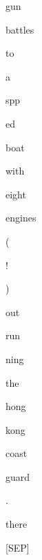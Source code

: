 \documentclass[varwidth=150mm]{standalone}
\begin{document}
\begin{CJK*}{UTF8}{gbsn}
{{{\colorbox{red!5.785243034362793}{\strut gun} \colorbox{red!3.0606062412261963}{\strut battles} \colorbox{red!3.203688383102417}{\strut to} \colorbox{red!4.213789939880371}{\strut a} \colorbox{red!6.602896690368652}{\strut spp}\colorbox{red!4.277715682983398}{\strut ed}\colorbox{red!17.725831985473633}{\strut boat} \colorbox{red!2.408601760864258}{\strut with} \colorbox{red!1.4817951917648315}{\strut eight} \colorbox{red!15.723183631896973}{\strut engines} \colorbox{red!6.670661449432373}{\strut (} \colorbox{red!6.659420967102051}{\strut !} \colorbox{red!1.9786384105682373}{\strut )} \colorbox{red!1.1148802042007446}{\strut out}\colorbox{red!2.905301809310913}{\strut run}\colorbox{red!1.390824794769287}{\strut ning} \colorbox{red!8.566407203674316}{\strut the} \colorbox{red!0.0}{\strut hong} \colorbox{red!3.5530812740325928}{\strut kong} \colorbox{red!18.30976104736328}{\strut coast} \colorbox{red!9.414864540100098}{\strut guard} \colorbox{red!0.0}{\strut .} \colorbox{red!31.8472843170166}{\strut there} \colorbox{red!2.3319778442382812}{\strut [SEP]}
}}}
\end{CJK*}
\end{document}
